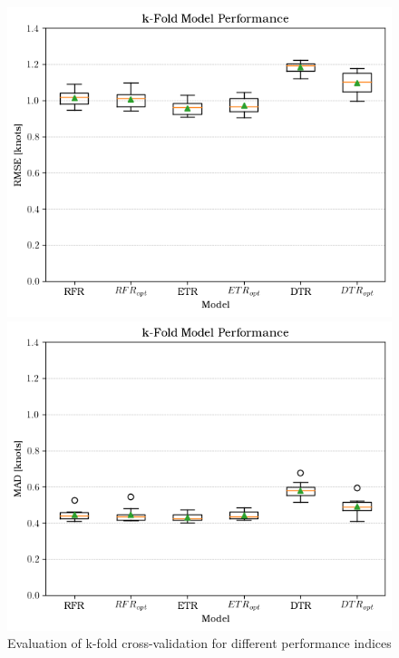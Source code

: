 \begin{figure}[ht]
    \vspace{0.5cm} %
  
    \begin{minipage}{0.45\textwidth}
      \centering
      \includegraphics[width=\textwidth]{02_figures/kfold_rmse_opt.png}
    \end{minipage}
    \hfill
    \begin{minipage}{0.45\textwidth}
      \centering
      \includegraphics[width=\textwidth]{02_figures/kfold_mad_opt.png}
    \end{minipage}
  
    \caption{Evaluation of k-fold cross-validation for different performance indices}
    \label{fig:k_fold_validation_result}
  \end{figure}

